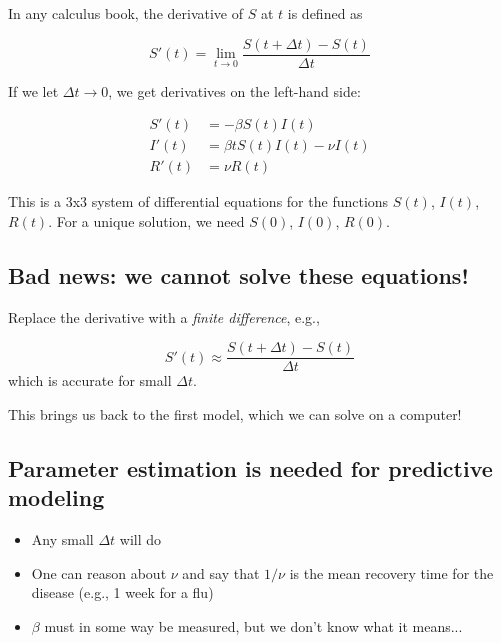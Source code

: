 \documentclass[%
twoside,                 %
final,                   %
10pt]{article}
\newenvironment{block_mdfboxadmon}[1][]{
\begin{block_mdfboxmdframed}[frametitle=#1]
}
{
\end{block_mdfboxmdframed}
}
\begin{document}
In any calculus book, the derivative of $S$ at $t$ is defined as

\[ S'(t) = \lim_{t\rightarrow 0}\frac{S(t+\Delta t) - S(t)}{\Delta t}\]

If we let $\Delta t\rightarrow 0$, we get derivatives on the left-hand side:

\begin{align*}
S'(t) &= - \beta S(t)I(t)\\
I'(t) &= \beta t S(t)I(t) -\nu I(t)\\
R'(t) &= \nu R(t)
\end{align*}

This is a 3x3 system of differential equations for the functions
$S(t)$, $I(t)$, $R(t)$. For a unique solution, we need
$S(0)$, $I(0)$, $R(0)$.

\subsection{Bad news: we cannot solve these equations!}


\begin{block_mdfboxadmon}
Replace the derivative with a \emph{finite difference}, e.g.,

\[ S'(t) \approx \frac{S(t+\Delta t) - S(t)}{\Delta t}\]
which is accurate for small $\Delta t$.
\end{block_mdfboxadmon}



This brings us back to the first model, which we can solve
on a computer!

\subsection{Parameter estimation is needed for predictive modeling}

\begin{itemize}
 \item Any small $\Delta t$ will do

 \item One can reason about $\nu$ and say that $1/\nu$ is the mean
   recovery time for the disease (e.g., 1 week for a flu)

 \item $\beta$ must in some way be measured, but we don't know what it means...
\end{itemize}

\noindent
\end{document}
